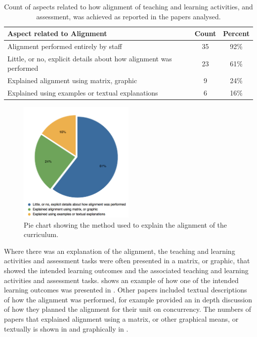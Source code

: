 \begin{table}[p]
	\centering
	\caption{Count of aspects related to how alignment of teaching and learning activities, and assessment, was achieved as reported in the papers analysed.}
	\label{tbl:alignment_details}
	\footnotesize
    \begin{tabular}{l|c|c}
     \textbf{Aspect related to Alignment} & \textbf{Count} & \textbf{Percent} \\ \hline
	Alignment performed entirely by staff	 & 35	& 92\% \\
	Little, or no, explicit details about how alignment was performed	 & 23	& 61\% \\
	Explained alignment using matrix, graphic & 	9	& 24\% \\
	Explained using examples or textual explanations & 	6	& 16\% \\
    \end{tabular}
\end{table}

\begin{figure}[p]
	\centering
	\includegraphics[width=0.5\textwidth]{AlignmentExplanation}
	\caption{Pie chart showing the method used to explain the alignment of the curriculum.}
	\label{fig:alignment_explain}
\end{figure}

Where there was an explanation of the alignment, the teaching and learning activities and assessment tasks were often presented in a matrix, or graphic, that showed the intended learning outcomes and the associated teaching and learning activities and assessment tasks.  shows an example of how one of the intended learning outcomes was presented in \citet{terrell2011using}. Other papers included textual descriptions of how the alignment was performed, for example \citet{Brabrand:2008} provided an in depth discussion of how they planned the alignment for their unit on concurrency. The numbers of papers that explained alignment using a matrix, or other graphical means, or textually is shown in  and graphically in .

